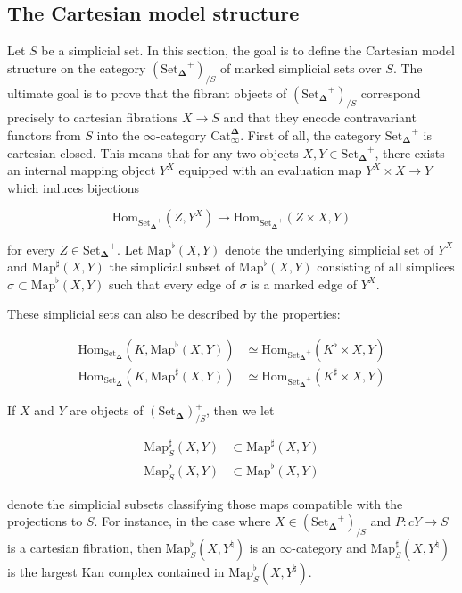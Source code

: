 \documentclass[12pt]{amsart}
\newcommand{\8}{\ensuremath{\infty}}
\newcommand{\SSet}{\ensuremath{\text{Set}_{\boldsymbol{\Delta}}}}
\newcommand{\Catinfdel}{\ensuremath{\text{Cat}^{\boldsymbol{\Delta}}_{\infty}}}
\newcommand{\Map}{\ensuremath{\text{Map}}}
\newcommand{\Hom}{\ensuremath{\text{Hom}}}
\begin{document}
\subsection{The Cartesian model structure}
Let $S$ be a simplicial set. In this section, the goal is to define the Cartesian model structure on the category $(\SSet^+)_{/S}$ of marked simplicial sets over $S$. The ultimate goal is to prove that the fibrant objects of $(\SSet^+)_{/S}$ correspond precisely to cartesian fibrations $X \rightarrow S$ and that they encode contravariant functors from $S$ into the \8-category \Catinfdel.
First of all, the category $\SSet^+$ is cartesian-closed. This means that for any two objects $X, Y\in \SSet^+$, there exists an internal mapping object $Y^X$ equipped with an evaluation map $Y^X\times X \rightarrow Y$ which induces bijections

$$
  \Hom_{\SSet^+}(Z, Y^X) \rightarrow \Hom_{\SSet^+}(Z\times X, Y)
$$

for every $Z \in \SSet^+$. Let $\Map^\flat(X, Y)$ denote the underlying simplicial set of $Y^X$ and $\Map^\sharp(X, Y)$ the simplicial subset of $\Map^\flat(X, Y)$ consisting of all simplices $\sigma\subset \Map^\flat(X, Y)$ such that every edge of $\sigma$ is a marked edge of $Y^X$.

These simplicial sets can also be described by the properties:

\begin{align*}
  \Hom_{\SSet}(K, \Map^\flat(X, Y))  & \simeq \Hom_{\SSet^+}(K^\flat\times X, Y)  \\
  \Hom_{\SSet}(K, \Map^\sharp(X, Y)) & \simeq \Hom_{\SSet^+}(K^\sharp\times X, Y)
\end{align*}

If $X$ and $Y$ are objects of $(\SSet)^+_{/S}$, then we let

\begin{align*}
  \Map_S^\sharp(X, Y) & \subset \Map^\sharp(X, Y) \\
  \Map_S^\flat(X, Y)  & \subset \Map^\flat(X, Y)
\end{align*}

denote the simplicial subsets classifying those maps compatible with the projections to $S$. For instance, in the case where $X \in (\SSet^+)_{/S}$ and $P: c Y \rightarrow S$ is a cartesian fibration, then $\Map^\flat_S(X, Y^\natural)$ is an \8-category and $\Map^\sharp_S(X, Y^\natural)$ is the largest Kan complex contained in $\Map^\flat_S(X, Y^\natural)$.
\end{document}
